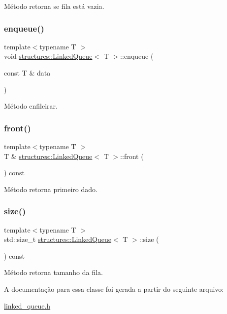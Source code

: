 Método retorna se fila está vazia. 

\mbox{\label{classstructures_1_1LinkedQueue_a6e9d6e444c5d534d01736bb82c34c815}} 
\subsubsection{\texorpdfstring{enqueue()}{enqueue()}}
{\footnotesize\ttfamily template$<$typename T $>$ \\
void \mbox{\hyperlink{classstructures_1_1LinkedQueue}{structures\+::\+Linked\+Queue}}$<$ T $>$\+::enqueue (\begin{DoxyParamCaption}\item[{const T \&}]{data }\end{DoxyParamCaption})}



Método enfileirar. 

\mbox{\label{classstructures_1_1LinkedQueue_a904219098f1f6b3aa229a8ea0f929b64}} 
\subsubsection{\texorpdfstring{front()}{front()}}
{\footnotesize\ttfamily template$<$typename T $>$ \\
T \& \mbox{\hyperlink{classstructures_1_1LinkedQueue}{structures\+::\+Linked\+Queue}}$<$ T $>$\+::front (\begin{DoxyParamCaption}{ }\end{DoxyParamCaption}) const}



Método retorna primeiro dado. 

\mbox{\label{classstructures_1_1LinkedQueue_ab86b0d95b796c277a21b89f106efd173}} 
\subsubsection{\texorpdfstring{size()}{size()}}
{\footnotesize\ttfamily template$<$typename T $>$ \\
std\+::size\+\_\+t \mbox{\hyperlink{classstructures_1_1LinkedQueue}{structures\+::\+Linked\+Queue}}$<$ T $>$\+::size (\begin{DoxyParamCaption}{ }\end{DoxyParamCaption}) const}



Método retorna tamanho da fila. 



A documentação para essa classe foi gerada a partir do seguinte arquivo\+:\begin{DoxyCompactItemize}
\item 
\mbox{\hyperlink{linked__queue_8h}{linked\+\_\+queue.\+h}}\end{DoxyCompactItemize}
